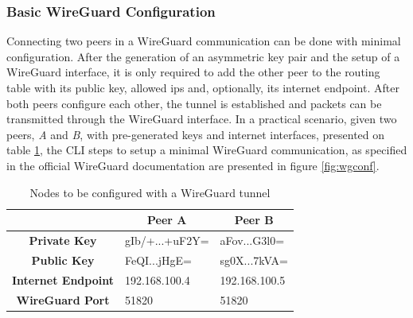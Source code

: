 \documentclass[11pt,twoside,a4paper]{report}
\begin{document}
\subsubsection{Basic WireGuard Configuration}

Connecting two peers in a WireGuard communication can be done with minimal configuration. After the generation of an asymmetric key pair and the setup of a WireGuard interface, it is only required to add the other peer to the routing table with its public key, allowed \ac{ip}s and, optionally, its internet endpoint. After both peers configure each other, the tunnel is established and packets can be transmitted through the WireGuard interface.
In a practical scenario, given two peers, \emph{A} and \emph{B}, with pre-generated keys and internet interfaces, presented on table \ref{tab:wgconfpeers}, the CLI steps to setup a minimal WireGuard communication, as specified in the official WireGuard documentation are presented in figure \ref{fig:wgconf}.


\begin{table}[]
\centering
\begin{tabular}{c|l|l|}
\cline{2-3}
\multicolumn{1}{l|}{}                            & \multicolumn{1}{c|}{\textbf{Peer A}} & \multicolumn{1}{c|}{\textbf{Peer B}} \\ \hline
\multicolumn{1}{|c|}{\textbf{Private Key}}       & gIb/+...+uF2Y=                       & aFov...G3l0=                         \\ \hline
\multicolumn{1}{|c|}{\textbf{Public Key}}        & FeQI...jHgE=                         & sg0X...7kVA=                         \\ \hline
\multicolumn{1}{|c|}{\textbf{Internet Endpoint}} & 192.168.100.4                        & 192.168.100.5                        \\ \hline
\multicolumn{1}{|c|}{\textbf{WireGuard Port}}    & 51820                                & 51820                                \\ \hline
\end{tabular}
\caption{Nodes to be configured with a WireGuard tunnel}
\label{tab:wgconfpeers}
\end{table}
\end{document}
